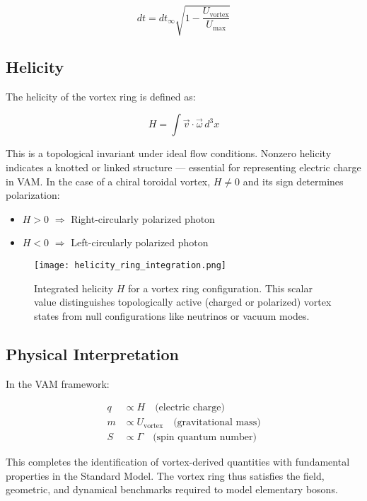 \begin{equation}
dt = dt_{\infty} \sqrt{1 - \frac{U_{\text{vortex}}}{U_{\text{max}}}}
\end{equation}

\subsection{Helicity}

The helicity of the vortex ring is defined as:

\begin{equation}
H = \int \vec{v} \cdot \vec{\omega} \, d^3x
\end{equation}

This is a topological invariant under ideal flow conditions. Nonzero helicity indicates a knotted or linked structure — essential for representing electric charge in VAM. In the case of a chiral toroidal vortex, $H \neq 0$ and its sign determines polarization:

\begin{itemize}
    \item $H > 0$ \quad $\Rightarrow$ Right-circularly polarized photon
    \item $H < 0$ \quad $\Rightarrow$ Left-circularly polarized photon
\end{itemize}

\begin{figure}[H]
    \centering
    \texttt{[image: helicity\_ring\_integration.png]}
    \caption{Integrated helicity $H$ for a vortex ring configuration. This scalar value distinguishes topologically active (charged or polarized) vortex states from null configurations like neutrinos or vacuum modes.}
\end{figure}

\subsection{Physical Interpretation}

In the VAM framework:

\begin{align*}
q &\propto H \quad \text{(electric charge)} \\
m &\propto U_{\text{vortex}} \quad \text{(gravitational mass)} \\
S &\propto \Gamma \quad \text{(spin quantum number)}
\end{align*}

This completes the identification of vortex-derived quantities with fundamental properties in the Standard Model. The vortex ring thus satisfies the field, geometric, and dynamical benchmarks required to model elementary bosons.

